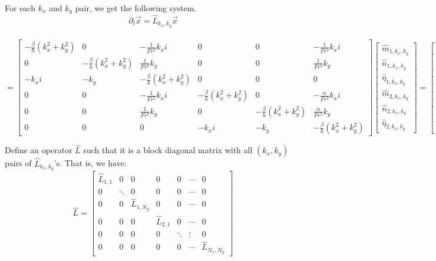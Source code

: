 \documentclass[10pt]{article}
\newcommand{\pd}[1]{\partial_{#1}}
\begin{document}
For each $k_x$ and $k_y$ pair, we get the following system.
\[\pd{t}\vec{x} = \hat{L}_{k_x,k_y}\vec{x} 
\]\\\[=
\left[\begin{array}{ccc|ccc}
-\frac{\beta}{h}(k_x^2+k_y^2) & 0 & -\frac{1}{Fr^2}k_xi & 0 & 0 & -\frac{1}{Fr^2}k_xi \\
0 & -\frac{\beta}{h}(k_x^2+k_y^2) & \frac{1}{Fr^2}k_y & 0 & 0 & \frac{1}{Fr^2}k_y\\
-k_xi & -k_y & -\frac{\beta}{h}(k_x^2+k_y^2) & 0 & 0 & 0 \\ \hline
0 & 0 & -\frac{1}{Fr^2}k_xi & -\frac{\beta}{h}(k_x^2+k_y^2) & 0 &  -\frac{\alpha}{Fr^2}k_xi \\
0 & 0 & \frac{1}{Fr^2}k_y & 0  & -\frac{\beta}{h}(k_x^2+k_y^2) &  \frac{\alpha}{Fr^2}k_y \\
0 & 0 & 0 & -k_xi & -k_y & -\frac{\beta}{h}(k_x^2+k_y^2)
\end{array}\right] \begin{bmatrix}
\hat{m}_{1,k_x,k_y}\\
\hat{n}_{1,k_x,k_y}\\
\hat{\eta}_{1,k_x,k_y}\\
\hat{m}_{2,k_x,k_y}\\
\hat{n}_{2,k_x,k_y}\\
\hat{\eta}_{2,k_x,k_y}
\end{bmatrix} = \begin{bmatrix}
\pd{t}\hat{m}_{1,k_x,k_y}\\
\pd{t}\hat{n}_{1,k_x,k_y}\\
\pd{t}\hat{\eta}_{1,k_x,k_y}\\
\pd{t}\hat{m}_{2,k_x,k_y}\\
\pd{t}\hat{n}_{2,k_x,k_y}\\
\pd{t}\hat{\eta}_{2,k_x,k_y}
\end{bmatrix}
\]

Define an operator $\hat{L}$ such that it is a block diagonal matrix with all $(k_x, k_y)$ pairs of $\hat{L}_{k_x,k_y}$'s.
That is, we have:
\[
\hat{L} = \begin{bmatrix}
\hat{L}_{1,1} & 0 & 0 & 0 & 0 & \cdots & 0 \\
0 & \ddots & 0 & 0 & 0 & \cdots& 0 \\
0 & 0 & \hat{L}_{1, N_y}  & 0 & 0 & \cdots & 0\\
0 & 0 & 0 & \hat{L}_{2,1}  & 0 & \cdots & 0\\
0 & 0 & 0 & 0 & \ddots  & \vdots& 0\\
0 & 0 & 0 & 0 & 0 & \cdots& \hat{L}_{N_x,N_y}
\end{bmatrix}\]
\end{document}

